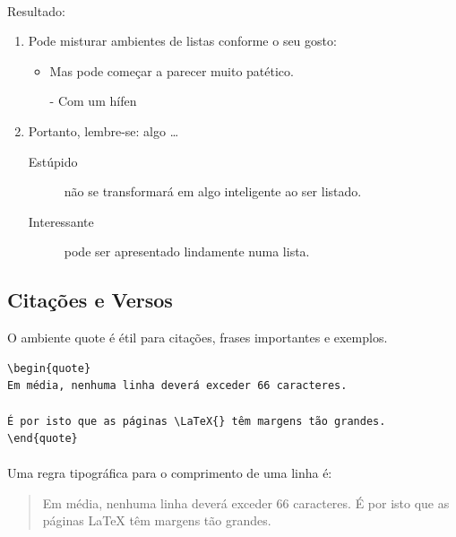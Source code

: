 \documentclass[a4paper,10pt]{report}
\begin{document}
\paragraph{}
Resultado:
\begin{enumerate}
\item Pode misturar ambientes de listas conforme o seu gosto:
\begin{itemize}
\item Mas pode começar a parecer muito patético.
\item[-] Com um hífen
\end{itemize}
\item Portanto, lembre-se: algo \dots
\begin{description}
\item[Estúpido] não se transformará em algo inteligente ao ser listado.
\item[Interessante] pode ser apresentado lindamente numa lista.
\end{description}
\end{enumerate}

\subsection{Citações e Versos}
O ambiente quote é étil para citações, frases importantes e exemplos.
\begin{verbatim}
\begin{quote}
Em média, nenhuma linha deverá exceder 66 caracteres.

É por isto que as páginas \LaTeX{} têm margens tão grandes.
\end{quote}
\end{verbatim}

\paragraph{}
Uma regra tipográfica para o comprimento de uma linha é:
\begin{quote}
Em média, nenhuma linha deverá exceder 66 caracteres.
É por isto que as páginas \LaTeX{} têm margens tão grandes.
\end{quote}
\end{document}
